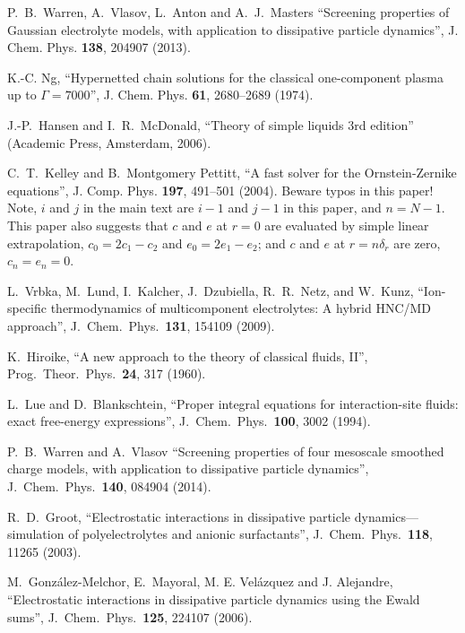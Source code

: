 \documentclass[12pt,a4paper]{article}
\begin{document}
\thebibliography{}

 P.~B.~Warren, A.~Vlasov, L.~Anton and A.~J.~Masters
  ``Screening properties of Gaussian electrolyte models, with
  application to dissipative particle dynamics'',
  J. Chem. Phys. {\bf138}, 204907 (2013).

 K.-C. Ng, ``Hypernetted chain solutions for the
  classical one-component plasma up to $\Gamma=7000$'',
  J. Chem. Phys. {\bf61}, 2680--2689 (1974).

 J.-P.~Hansen and I.~R.~McDonald, ``Theory of simple
  liquids 3rd edition'' (Academic Press, Amsterdam, 2006).

 C.~T.~Kelley and B.~Montgomery Pettitt, ``A fast
  solver for the Ornstein-Zernike equations'',
  J. Comp. Phys. {\bf197}, 491--501 (2004).  Beware typos in this
  paper!  Note, $i$ and $j$ in the main text are $i-1$ and $j-1$ in
  this paper, and $n = N-1$.  This paper also suggests that $c$ and
  $e$ at $r = 0$ are evaluated by simple linear extrapolation, $c_0 =
  2 c_1 - c_2$ and $e_0 = 2 e_1 - e_2$; and $c$ and $e$ at $r =
  n\delta_r$ are zero, $c_n = e_n = 0$.

 L.~Vrbka, M.~Lund, I.~Kalcher, J.~Dzubiella,
  R.~R.~Netz, and W.~Kunz, ``Ion-specific thermodynamics of
  multicomponent electrolytes: A hybrid HNC/MD approach'',
  J.\ Chem.\ Phys.\ {\bf131}, 154109 (2009).

 K.~Hiroike, ``A new approach to the theory of
  classical fluids, II'', Prog.\ Theor.\ Phys.\ {\bf24}, 317 (1960).

 L.~Lue and D.~Blankschtein, ``Proper integral equations
  for interaction-site fluids: exact free-energy expressions'',
  J.\ Chem.\ Phys.\ {\bf100}, 3002 (1994).
  
 P.~B.~Warren and A.~Vlasov ``Screening properties of
  four mesoscale smoothed charge models, with application to
  dissipative particle dynamics'', J.\ Chem.\ Phys.\ {\bf140}, 084904
  (2014).

R.~D.~Groot, ``Electrostatic interactions in
  dissipative particle dynamics---simulation of polyelectrolytes and
  anionic surfactants'', J.\ Chem.\ Phys.\ {\bf118}, 11265 (2003).

M.~Gonz\'alez-Melchor, E.~Mayoral, M. E. Vel\'azquez
  and J. Alejandre, ``Electrostatic interactions in dissipative
  particle dynamics using the Ewald sums'', J.\ Chem.\ Phys.\ {\bf125},
  224107 (2006).
\end{document}
